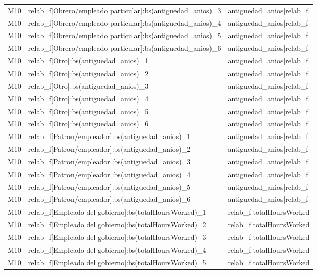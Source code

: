\begin{longtable}{lll}
M10 & relab\_f[Obrero/empleado particular]:bs(antiguedad\_anios)\_3 & antiguedad\_anios|relab\_f \\
M10 & relab\_f[Obrero/empleado particular]:bs(antiguedad\_anios)\_4 & antiguedad\_anios|relab\_f \\
M10 & relab\_f[Obrero/empleado particular]:bs(antiguedad\_anios)\_5 & antiguedad\_anios|relab\_f \\
M10 & relab\_f[Obrero/empleado particular]:bs(antiguedad\_anios)\_6 & antiguedad\_anios|relab\_f \\
M10 & relab\_f[Otro]:bs(antiguedad\_anios)\_1 & antiguedad\_anios|relab\_f \\
M10 & relab\_f[Otro]:bs(antiguedad\_anios)\_2 & antiguedad\_anios|relab\_f \\
M10 & relab\_f[Otro]:bs(antiguedad\_anios)\_3 & antiguedad\_anios|relab\_f \\
M10 & relab\_f[Otro]:bs(antiguedad\_anios)\_4 & antiguedad\_anios|relab\_f \\
M10 & relab\_f[Otro]:bs(antiguedad\_anios)\_5 & antiguedad\_anios|relab\_f \\
M10 & relab\_f[Otro]:bs(antiguedad\_anios)\_6 & antiguedad\_anios|relab\_f \\
M10 & relab\_f[Patron/empleador]:bs(antiguedad\_anios)\_1 & antiguedad\_anios|relab\_f \\
M10 & relab\_f[Patron/empleador]:bs(antiguedad\_anios)\_2 & antiguedad\_anios|relab\_f \\
M10 & relab\_f[Patron/empleador]:bs(antiguedad\_anios)\_3 & antiguedad\_anios|relab\_f \\
M10 & relab\_f[Patron/empleador]:bs(antiguedad\_anios)\_4 & antiguedad\_anios|relab\_f \\
M10 & relab\_f[Patron/empleador]:bs(antiguedad\_anios)\_5 & antiguedad\_anios|relab\_f \\
M10 & relab\_f[Patron/empleador]:bs(antiguedad\_anios)\_6 & antiguedad\_anios|relab\_f \\
M10 & relab\_f[Empleado del gobierno]:bs(totalHoursWorked)\_1 & relab\_f|totalHoursWorked \\
M10 & relab\_f[Empleado del gobierno]:bs(totalHoursWorked)\_2 & relab\_f|totalHoursWorked \\
M10 & relab\_f[Empleado del gobierno]:bs(totalHoursWorked)\_3 & relab\_f|totalHoursWorked \\
M10 & relab\_f[Empleado del gobierno]:bs(totalHoursWorked)\_4 & relab\_f|totalHoursWorked \\
M10 & relab\_f[Empleado del gobierno]:bs(totalHoursWorked)\_5 & relab\_f|totalHoursWorked \\

\end{longtable}
